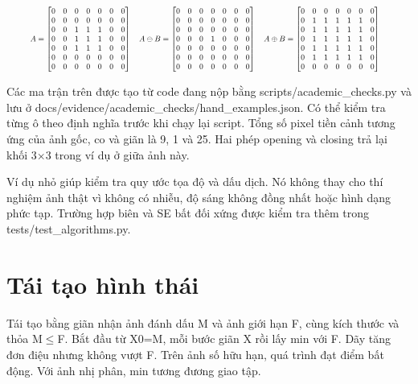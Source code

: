 \documentclass[12pt,a4paper,oneside]{report}
\begin{document}
\begin{equation}\resizebox{0.92\linewidth}{!}{$ A=\begin{bmatrix}0&0&0&0&0&0&0\\0&0&0&0&0&0&0\\0&0&1&1&1&0&0\\0&0&1&1&1&0&0\\0&0&1&1&1&0&0\\0&0&0&0&0&0&0\\0&0&0&0&0&0&0\end{bmatrix}\quad A\ominus B=\begin{bmatrix}0&0&0&0&0&0&0\\0&0&0&0&0&0&0\\0&0&0&0&0&0&0\\0&0&0&1&0&0&0\\0&0&0&0&0&0&0\\0&0&0&0&0&0&0\\0&0&0&0&0&0&0\end{bmatrix}\quad A\oplus B=\begin{bmatrix}0&0&0&0&0&0&0\\0&1&1&1&1&1&0\\0&1&1&1&1&1&0\\0&1&1&1&1&1&0\\0&1&1&1&1&1&0\\0&1&1&1&1&1&0\\0&0&0&0&0&0&0\end{bmatrix}\quad $}\end{equation}

Các ma trận trên được tạo từ code đang nộp bằng scripts/academic\_checks.py và lưu ở docs/evidence/academic\_checks/hand\_examples.json. Có thể kiểm tra từng ô theo định nghĩa trước khi chạy lại script. Tổng số pixel tiền cảnh tương ứng của ảnh gốc, co và giãn là 9, 1 và 25. Hai phép opening và closing trả lại khối 3\ensuremath{\times}3 trong ví dụ ở giữa ảnh này.

Ví dụ nhỏ giúp kiểm tra quy ước tọa độ và dấu dịch. Nó không thay cho thí nghiệm ảnh thật vì không có nhiễu, độ sáng không đồng nhất hoặc hình dạng phức tạp. Trường hợp biên và SE bất đối xứng được kiểm tra thêm trong tests/test\_algorithms.py.

\section{Tái tạo hình thái}
Tái tạo bằng giãn nhận ảnh đánh dấu M và ảnh giới hạn F, cùng kích thước và thỏa M\ensuremath{\leq}F. Bắt đầu từ X0=M, mỗi bước giãn X rồi lấy min với F. Dãy tăng đơn điệu nhưng không vượt F. Trên ảnh số hữu hạn, quá trình đạt điểm bất động. Với ảnh nhị phân, min tương đương giao tập.
\end{document}
